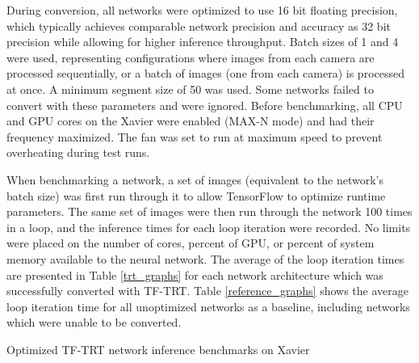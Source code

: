 During conversion, all networks were optimized to use 16 bit floating precision, which typically achieves comparable network precision and accuracy as 32 bit precision while allowing for higher inference throughput. Batch sizes of 1 and 4 were used, representing configurations where images from each camera are processed sequentially, or a batch of images (one from each camera) is processed at once. A minimum segment size of 50 was used. Some networks failed to convert with these parameters and were ignored. Before benchmarking, all CPU and GPU cores on the Xavier were enabled (MAX-N mode) and had their frequency maximized. The fan was set to run at maximum speed to prevent overheating during test runs. 

When benchmarking a network, a set of images (equivalent to the network's batch size) was first run through it to allow TensorFlow to optimize runtime parameters. The same set of images were then run through the network 100 times in a loop, and the inference times for each loop iteration were recorded. No limits were placed on the number of cores, percent of GPU, or percent of system memory available to the neural network. The average of the loop iteration times are presented in Table \ref{trt_graphs} for each network architecture which was successfully converted with TF-TRT. Table \ref{reference_graphs} shows the average loop iteration time for all unoptimized networks as a baseline, including networks which were unable to be converted.


\begin{table}
	\centering
	\begin{adjustbox}{max width=.95\textwidth}
	\end{adjustbox}
	\caption{Optimized TF-TRT network inference benchmarks on Xavier}
	\label{trt_graphs}
\end{table}


